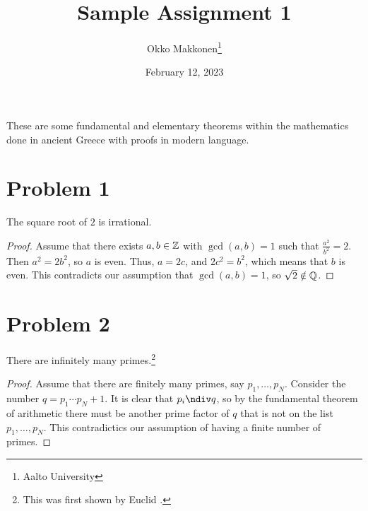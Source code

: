 \documentclass{myassignment}
\title{Sample Assignment 1}
\author{Okko Makkonen\thanks{Aalto University}}
\date{February 12, 2023}
\begin{document}
\maketitle

These are some fundamental and elementary theorems within the mathematics done in ancient Greece with proofs in modern language.
    
\section{Problem 1}

\begin{claim}
The square root of $2$ is irrational.
\end{claim}

\begin{proof}
Assume that there exists $a, b \in \mathbb{Z}$ with $\gcd(a, b) = 1$ such that $\frac{a^2}{b^2} = 2$. Then $a^2 = 2b^2$, so $a$ is even. Thus, $a = 2c$, and $2c^2 = b^2$, which means that $b$ is even. This contradicts our assumption that $\gcd(a, b) = 1$, so $\sqrt{2} \notin \mathbb{Q}$.
\end{proof}

\section{Problem 2}

\begin{claim}
There are infinitely many primes.\footnote{This was first shown by Euclid \cite{euclid400BCE}.}
\end{claim}

\begin{proof}
Assume that there are finitely many primes, say $p_1, \dots, p_N$. Consider the number $q = p_1 \cdots p_N + 1$. It is clear that $p_i \ndiv q$, so by the fundamental theorem of arithmetic there must be another prime factor of $q$ that is not on the list $p_1, \dots, p_N$. This contradictics our assumption of having a finite number of primes.
\end{proof}



\end{document}
